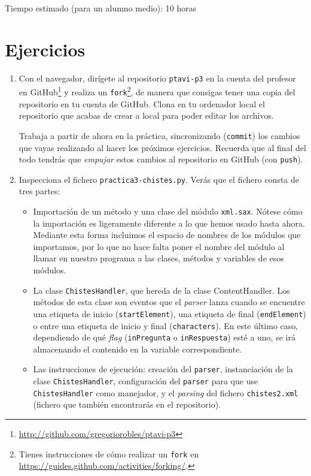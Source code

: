 \documentclass[11pt,a4paper]{article}
\newcommand{\finejercicio}{
  \begin{footnotesize}
    [Al terminar el ejercicio es recomendable hacer \texttt{commit} de los ficheros modificados]
  \end{footnotesize}
}
\begin{document}
Tiempo estimado (para un alumno medio): 10 horas

\section{Ejercicios}

\begin{enumerate}
    \item Con el navegador, dirígete al repositorio \texttt{ptavi-p3} en la cuenta del profesor en GitHub\footnote{\url{http://github.com/gregoriorobles/ptavi-p3}} y realiza un \texttt{fork}\footnote{Tienes instrucciones de cómo realizar un \texttt{fork} en \url{https://guides.github.com/activities/forking/}.}, de manera que consigas tener una copia del repositorio en tu cuenta de GitHub. Clona en tu ordenador local el repositorio que acabas de crear a local para poder editar los archivos.

  Trabaja a partir de ahora en la práctica, sincronizando (\texttt{commit}) los cambios que vayas realizando al hacer los próximos ejercicios. Recuerda que al final del todo tendrás que \emph{empujar} estos cambios al repositorio en GitHub (con \texttt{push}).


  \item Inspecciona el fichero \texttt{practica3-chistes.py}. Verás que el fichero consta de tres partes:
  \begin{itemize}
    \item Importación de un método y una clase del módulo \texttt{xml.sax}. Nótese cómo la importación es ligeramente diferente a lo que hemos usado hasta ahora. Mediante esta forma incluimos el espacio de nombres de los módulos que importamos, por lo que no hace falta poner el nombre del módulo al llamar en nuestro programa a las clases, métodos y variables de esos módulos.
    \item La clase \texttt{ChistesHandler}, que hereda de la clase ContentHandler. Los métodos de esta clase son eventos que el \emph{parser} lanza cuando se encuentre una etiqueta de inicio (\texttt{startElement}), una etiqueta de final (\texttt{endElement}) o entre una etiqueta de inicio y final (\texttt{characters}). En este último caso, dependiendo de qué \emph{flag} (\texttt{inPregunta} o \texttt{inRespuesta}) esté a uno, se irá almacenando el contenido en la variable correspondiente.
    \item Las instrucciones de ejecución: creación del \texttt{parser}, instanciación de la clase \texttt{ChistesHandler}, configuración del \texttt{parser} para que use \texttt{ChistesHandler} como manejador, y el \emph{parsing} del fichero \texttt{chistes2.xml} (fichero que también encontrarás en el repositorio).
  \end{itemize}


\end{enumerate}
\end{document}

